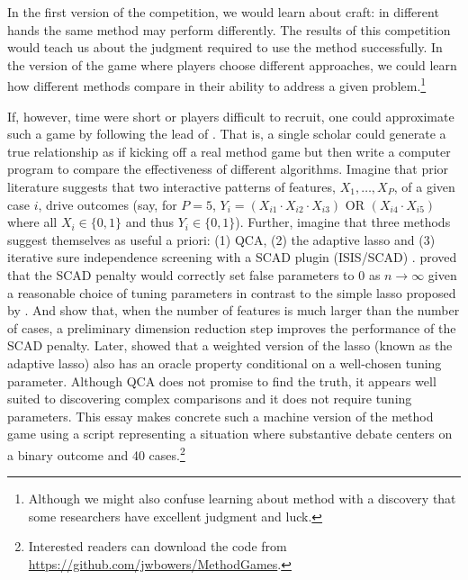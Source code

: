 \documentclass[12pt]{article}
\begin{document}

In the first version of the
competition, we would learn about craft: in different hands the same method
may perform differently. The results of this competition would teach us about
the judgment required to use the method successfully.  In the version of the
game where players choose different approaches, we could learn how different
methods compare in their ability to address a given problem.\footnote{Although
  we might also confuse learning about method with a discovery that some
  researchers have excellent judgment and luck.}

If, however, time were short or players difficult to recruit, one could
approximate such a game by following the lead of \citet{lucasfk2014}. That is,
a single scholar could generate a true relationship as if kicking off a real
method game but then write a computer program to compare the effectiveness of
different algorithms. Imagine that prior literature suggests that two
interactive patterns of features, $X_1, \ldots, X_P$, of a given case $i$,
drive outcomes (say, for $P=5$, $Y_i= (X_{i1} \cdot X_{i2} \cdot X_{i3} )
\text{ OR } ( X_{i4} \cdot X_{i5} )$ where all $X_i  \in \{0,1\}$ and thus
$Y_i \in \{0,1\}$).  Further, imagine that three methods suggest themselves as
useful a priori: (1) QCA, (2) the adaptive lasso and (3) iterative sure
independence screening with a SCAD plugin (ISIS/SCAD) \citep{fan2008sure}.
\citet{fan2001variable} proved that the SCAD penalty would correctly set false
parameters to 0 as $n \rightarrow \infty$ given a reasonable choice of tuning
parameters in contrast to the simple lasso proposed by
\cite{tibshirani1996regression}.  And \citet{fan2008sure} show that, when the
number of features is much larger than the number of cases, a preliminary
dimension reduction step improves the performance of the SCAD penalty.  Later,
\citet{zou2006adaptive} showed that a weighted version of the lasso (known as
the adaptive lasso) also has an oracle property conditional on a well-chosen
tuning parameter. Although QCA does not promise to find the truth, it appears
well suited to discovering complex comparisons and it does not require tuning
parameters.  This essay makes concrete such a machine version of the method
game using a script representing a situation where substantive debate centers
on a binary outcome and 40 cases.\footnote{Interested readers can download the
  code from \url{https://github.com/jwbowers/MethodGames}.}
\end{document}
